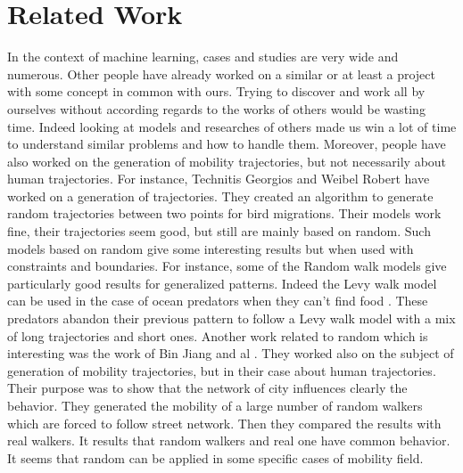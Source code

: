 \documentclass[a4]{article}
\begin{document}
\newpage
\section{Related Work}
In the context of machine learning, cases and studies are very wide and numerous. Other people have already worked on a similar or at least a project with some concept in common with ours. Trying to discover and work all by ourselves without according regards to the works of others would be wasting time. Indeed looking at models and researches of others made us win a lot of time to understand similar problems and how to handle them. 
Moreover, people have also worked on the generation of mobility trajectories, but not necessarily about human trajectories. For instance, Technitis Georgios and Weibel Robert \cite{technitis} have worked on a generation of trajectories. They created an algorithm to generate random trajectories between two points for bird migrations. Their models work fine, their trajectories seem good, but still are mainly based on random. Such models based on random give some interesting results but when used with constraints and boundaries. 
For instance, some of the Random walk models give particularly good results for generalized patterns. Indeed the Levy walk model can be used in the case of ocean predators when they can't find food \cite{humphries2010environmental}. These predators abandon their previous pattern to follow a Levy walk model with a mix of long trajectories and short ones. 
Another work related to random which is interesting was the work of Bin Jiang and al \cite{jiang2009characterizing}. They worked also on the subject of generation of mobility trajectories, but in their case about human trajectories. Their purpose was to show that the network of city influences clearly the behavior. They generated the mobility of a large number of random walkers which are forced to follow street network. Then they compared the results with real walkers. It results that random walkers and real one have common behavior. It seems that random can be applied in some specific cases of mobility field.
\end{document}
